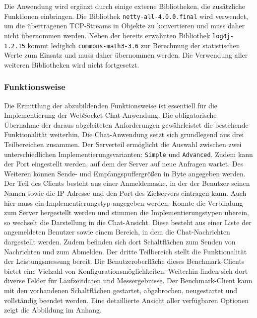 \documentclass[11pt,a4paper,titlepage]{scrartcl}
\numberwithin{equation}{section}
\begin{document}
\noindent Die Anwendung wird ergänzt durch einige externe Bibliotheken, die zusätzliche Funktionen einbringen. Die Bibliothek \texttt{netty-all-4.0.0.final} wird verwendet, um die übertragenen TCP-Streams in Objekte zu konvertieren und muss daher nicht übernommen werden. Neben der bereits erwähnten Bibliothek \texttt{log4j-1.2.15} kommt lediglich \texttt{commons-math3-3.6} zur Berechnung der statistischen Werte zum Einsatz und muss daher übernommen werden. Die Verwendung aller weiteren Bibliotheken wird nicht fortgesetzt.

\subsubsection{Funktionsweise}
Die Ermittlung der abzubildenden Funktionsweise ist essentiell für die Implementierung der WebSocket-Chat-Anwendung. Die obligatorische Übernahme der daraus abgeleiteten Anforderungen gewährleistet die bestehende Funktionalität weiterhin. Die Chat-Anwendung setzt sich grundlegend aus drei Teilbereichen zusammen. Der Serverteil ermöglicht die Auswahl zwischen zwei unterschiedlichen Implementierungsvarianten: \texttt{Simple} und \texttt{Advanced}. Zudem kann der Port eingestellt werden, auf dem der Server auf neue Anfragen wartet. Des Weiteren können Sende- und Empfangspuffergrößen in Byte angegeben werden. Der Teil des Clients besteht aus einer Anmeldemaske, in der der Benutzer seinen Namen sowie die IP-Adresse und den Port des Zielservers eintragen kann. Auch hier muss ein Implementierungstyp angegeben werden. Konnte die Verbindung zum Server hergestellt werden und stimmen die Implementierungstypen überein, so wechselt die Darstellung in die Chat-Ansicht. Diese besteht aus einer Liste der angemeldeten Benutzer sowie einem Bereich, in dem die Chat-Nachrichten dargestellt werden. Zudem befinden sich dort Schaltflächen zum Senden von Nachrichten und zum Abmelden. Der dritte Teilbereich stellt die Funktionalität der Leistungsmessung bereit. Die Benutzeroberfläche dieses Benchmark-Clients bietet eine Vielzahl von Konfigurationsmöglichkeiten. Weiterhin finden sich dort diverse Felder für Laufzeitdaten und Messergebnisse. Der Benchmark-Client kann mit den vorhandenen Schaltflächen gestartet, abgebrochen, neugestartet und vollständig beendet werden. Eine detaillierte Ansicht aller verfügbaren Optionen zeigt die Abbildung im Anhang.\\
\end{document}
